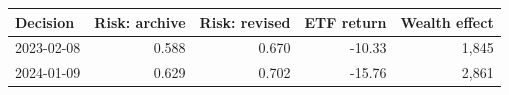 \begin{tabular}{@{}lrrrr@{}}
\toprule
Decision & Risk: archive & Risk: revised & ETF return & Wealth effect \\
\midrule
2023-02-08 & 0.588 & 0.670 & -10.33 & 1,845 \\
2024-01-09 & 0.629 & 0.702 & -15.76 & 2,861 \\
\bottomrule
\end{tabular}